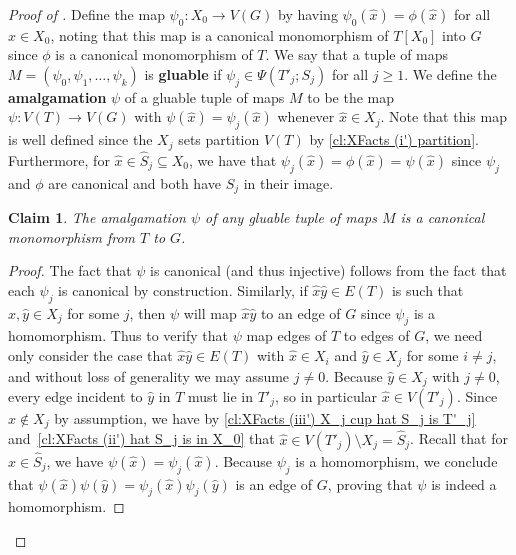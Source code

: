 \documentclass[12pt,letterpaper]{article}
\newtheorem{claim}[theorem]{Claim}
\theoremstyle{definition}
\newcommand{\sm}{\setminus}
\begin{document}
\begin{proof}[Proof of ]
		Define the map $\psi_0:X_0\to V(G)$ by having $\psi_0(\hat{x})=\phi(\hat{x})$ for all $\hat{x}\in X_0$, noting that this map is a canonical monomorphism of $T[X_0]$ into $G$ since $\phi$ is a canonical monomorphism of $T$.  We say that a tuple of maps $M=(\psi_0,\psi_1,\ldots,\psi_k)$ is \textbf{gluable} if $\psi_j\in \Psi(T'_j;S_j)$ for all $j\ge 1$.  We define the \textbf{amalgamation} $\psi$ of a gluable tuple of maps $M$ to be the map $\psi:V(T)\to V(G)$ with $\psi(\hat{x})=\psi_j(\hat{x})$ whenever $\hat{x}\in X_j$.  Note that this map is well defined since the $X_j$ sets partition $V(T)$ by \ref{cl:XFacts (i') partition}. Furthermore, for $\hat{x}\in \widehat{S}_j\subseteq X_0$, we have that $\psi_j(\hat{x})=\phi(\hat{x})=\psi(\hat{x})$ since $\psi_j$ and $\phi$ are canonical and both have $S_j$ in their image.
		
		\begin{claim}\label{cl:amalag}
			The amalgamation $\psi$ of any gluable tuple of maps $M$ is a canonical monomorphism from $T$ to $G$.
		\end{claim}
		\begin{proof}
			The fact that $\psi$ is canonical (and thus injective) follows from the fact that each $\psi_j$ is canonical by construction.  Similarly, if $\hat{x}\hat{y}\in E(T)$ is such that $\hat{x},\hat{y}\in X_j$ for some $j$, then $\psi$ will map $\hat{x}\hat{y}$ to an edge of $G$ since $\psi_j$ is a homomorphism.  Thus to verify that $\psi$ map edges of $T$ to edges of $G$, we need only consider the case that $\hat{x}\hat{y}\in E(T)$ with $\hat{x}\in X_i$ and $\hat{y}\in X_j$ for some $i\ne j$, and without loss of generality we may assume $j\ne 0$.  Because $\hat{y}\in X_j$ with $j\ne 0$, every edge incident to $\hat{y}$ in $T$ must lie in $T'_j$, so in particular $\hat{x}\in V(T'_j)$.  Since $\hat{x}\notin X_j$ by assumption, we have by \ref{cl:XFacts (iii') X_j cup hat S_j is T'_j} and~\ref{cl:XFacts (ii') hat S_j is in X_0} that $\hat{x}\in V(T'_j)\sm X_j=\widehat{S}_j$. Recall that for $\hat{x}\in \widehat{S}_j$, we have $\psi(\hat{x})=\psi_j(\hat{x})$. Because $\psi_j$ is a homomorphism, we conclude that $\psi(\hat{x})\psi(\hat{y})=\psi_j(\hat{x})\psi_j(\hat{y})$ is an edge of $G$, proving that $\psi$ is indeed a homomorphism.
		\end{proof}
		

\end{proof}
\end{document}
